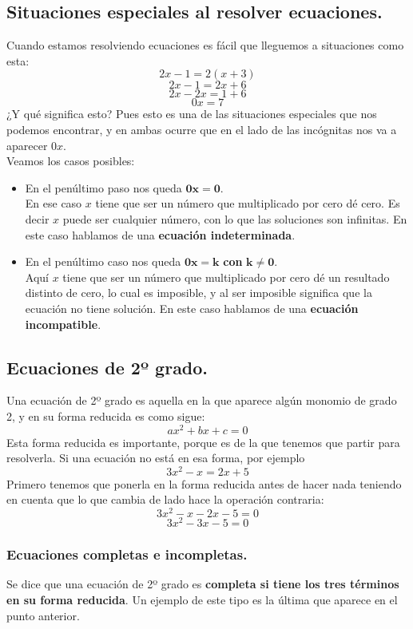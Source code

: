 \documentclass[a4paper,11pt,answers]{exam}
\begin{document}
  \subsection{Situaciones especiales al resolver ecuaciones.}
  Cuando estamos resolviendo ecuaciones es fácil que lleguemos a situaciones como esta:
  \[2x - 1 = 2(x + 3)\]
  \[2x - 1 = 2x + 6\]
  \[2x - 2x = 1+6\]
  \[0x = 7\]
  ¿Y qué significa esto? Pues esto es una de las situaciones especiales que nos podemos encontrar, y en ambas ocurre que en el lado de las incógnitas nos va a aparecer $0x$.\\
  Veamos los casos posibles:
  \begin{itemize}
  \item En el penúltimo paso nos queda $\boldsymbol{0x = 0}$.\\
    En ese caso $x$ tiene que ser un número que multiplicado por cero dé cero. Es decir $x$ puede ser cualquier número, con lo que las soluciones son infinitas. En este caso hablamos de una \textbf{ecuación indeterminada}.
  \item En el penúltimo caso nos queda $\boldsymbol{0x = k}$ \textbf{con} $\boldsymbol{k \neq 0}$.\\
    Aquí $x$ tiene que ser un número que multiplicado por cero dé un resultado distinto de cero, lo cual es imposible, y al ser imposible significa que la ecuación no tiene solución. En este caso hablamos de una \textbf{ecuación incompatible}.
  \end{itemize}

  \subsection{Ecuaciones de 2º grado.} \label{ecs_grado_2}
  Una ecuación de 2º grado es aquella en la que aparece algún monomio de grado 2, y en su forma reducida es como sigue:
  \[ax^2 + bx + c = 0\]
  Esta forma reducida es importante, porque es de la que tenemos que partir para resolverla. Si una ecuación no está en esa forma, por ejemplo
  \[3x^2 - x = 2x + 5\]
  Primero tenemos que ponerla en la forma reducida antes de hacer nada teniendo en cuenta que lo que cambia de lado hace la operación contraria:
  \[3x^2 - x - 2x - 5 = 0\]
  \[3x^2 - 3x - 5 = 0\]

  \subsubsection{Ecuaciones completas e incompletas.} \label{tipos_grado_2}
  Se dice que una ecuación de 2º grado es \textbf{completa si tiene los tres términos en su forma reducida}. Un ejemplo de este tipo es la última que aparece en el punto anterior.\\
\end{document}

